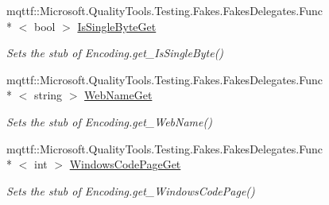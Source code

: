 \begin{DoxyCompactItemize}
mqttf\-::\-Microsoft.\-Quality\-Tools.\-Testing.\-Fakes.\-Fakes\-Delegates.\-Func\\*
$<$ bool $>$ \hyperlink{class_system_1_1_text_1_1_fakes_1_1_stub_encoding_aac499d277cd63f8b0850d36080d636b7}{Is\-Single\-Byte\-Get}
\begin{DoxyCompactList}\small\item\em Sets the stub of Encoding.\-get\-\_\-\-Is\-Single\-Byte()\end{DoxyCompactList}\item 
mqttf\-::\-Microsoft.\-Quality\-Tools.\-Testing.\-Fakes.\-Fakes\-Delegates.\-Func\\*
$<$ string $>$ \hyperlink{class_system_1_1_text_1_1_fakes_1_1_stub_encoding_a43179bb1a9a5cc409e7e22efe0189923}{Web\-Name\-Get}
\begin{DoxyCompactList}\small\item\em Sets the stub of Encoding.\-get\-\_\-\-Web\-Name()\end{DoxyCompactList}\item 
mqttf\-::\-Microsoft.\-Quality\-Tools.\-Testing.\-Fakes.\-Fakes\-Delegates.\-Func\\*
$<$ int $>$ \hyperlink{class_system_1_1_text_1_1_fakes_1_1_stub_encoding_a1b1234ac59b29fc146b2610d45e70c4b}{Windows\-Code\-Page\-Get}
\begin{DoxyCompactList}\small\item\em Sets the stub of Encoding.\-get\-\_\-\-Windows\-Code\-Page()\end{DoxyCompactList}\end{DoxyCompactItemize}
